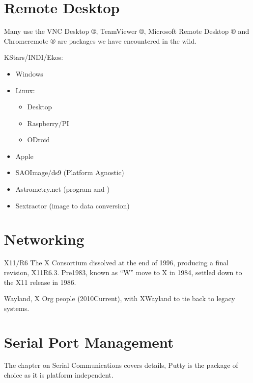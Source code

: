 \documentclass[letterpaper,10pt,english,openany,oneside]{sphinxmanual}
\begin{document}
\section{Remote Desktop}
\label{\detokenize{software:remote-desktop}}
\sphinxAtStartPar
Many use the VNC Desktop ®, TeamViewer ®, Microsoft Remote
Desktop ® and Chromeremote ® are packages we have encountered
in the wild.

\sphinxAtStartPar
KStars/INDI/Ekos:
\begin{itemize}
\item {} 
\sphinxAtStartPar
Windows

\item {} 
\sphinxAtStartPar
Linux:
\begin{itemize}
\item {} 
\sphinxAtStartPar
Desktop

\item {} 
\sphinxAtStartPar
Raspberry/PI

\item {} 
\sphinxAtStartPar
ODroid

\end{itemize}

\item {} 
\sphinxAtStartPar
Apple

\item {} 
\sphinxAtStartPar
SAOImage/ds9 (Platform Agnostic)

\item {} 
\sphinxAtStartPar
Astrometry.net (program and )

\item {} 
\sphinxAtStartPar
Sextractor (image to data conversion)

\end{itemize}


\section{Networking}
\label{\detokenize{software:networking}}
\sphinxAtStartPar
X11/R6 The X Consortium dissolved at the end of 1996, producing a
final revision, X11R6.3. Pre\sphinxhyphen{}1983, known as “W” \textendash{} move to X in
1984, settled down to the X11 release in 1986.

\sphinxAtStartPar
Wayland, X Org people (2010\sphinxhyphen{}Current), with XWayland to tie back
to legacy systems.


\section{Serial Port Management}
\label{\detokenize{software:serial-port-management}}
\sphinxAtStartPar
The chapter on Serial Communications covers details, Putty is the
package of choice as it is platform independent.
\end{document}
